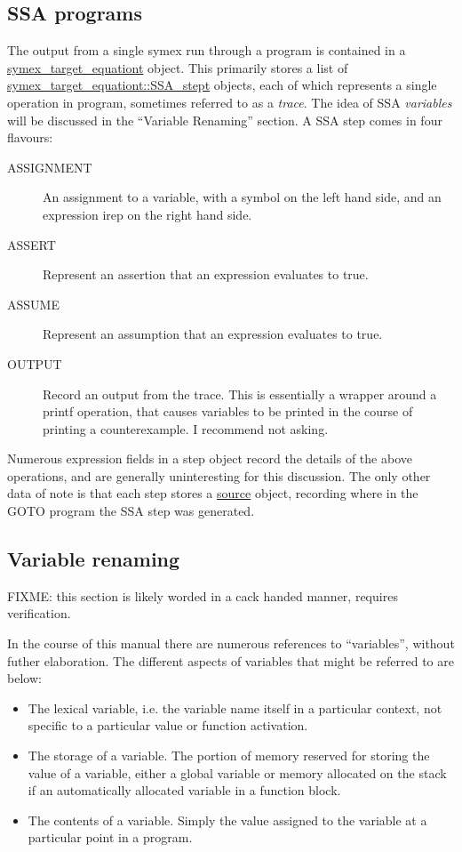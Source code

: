 \documentclass{article}
\begin{document}
\subsection{SSA programs}

The output from a single symex run through a program is contained in a
\url{symex_target_equationt} object. This primarily stores a list of
\url{symex_target_equationt::SSA_stept} objects, each of which represents
a single operation in program, sometimes referred to as a \textit{trace}.
The idea of SSA \textit{variables} will be discussed in the ``Variable
Renaming'' section. A SSA step comes in four flavours:

\begin{description}
\item[ASSIGNMENT] An assignment to a variable, with a symbol on the left hand
side, and an expression irep on the right hand side.
\item[ASSERT] Represent an assertion that an expression evaluates to true.
\item[ASSUME] Represent an assumption that an expression evaluates to true.
\item[OUTPUT] Record an output from the trace. This is essentially a wrapper
around a printf operation, that causes variables to be printed in the
course of printing a counterexample. I recommend not asking.
\end{description}

Numerous expression fields in a step object record the details of the above
operations, and are generally uninteresting for this discussion. The only
other data of note is that each step stores a \url{source} object, recording
where in the GOTO program the SSA step was generated.

\subsection{Variable renaming}

FIXME: this section is likely worded in a cack handed manner, requires
verification.

In the course of this manual there are numerous references to ``variables'',
without futher elaboration. The different aspects of variables that might be
referred to are below:

\begin{itemize}
\item The lexical variable, i.e. the variable name itself in a particular
context, not specific to a particular value or function activation.
\item The storage of a variable. The portion of memory reserved for storing
the value of a variable, either a global variable or memory allocated on the
stack if an automatically allocated variable in a function block.
\item The contents of a variable. Simply the value assigned to the variable
at a particular point in a program.
\end{itemize}
\end{document}
